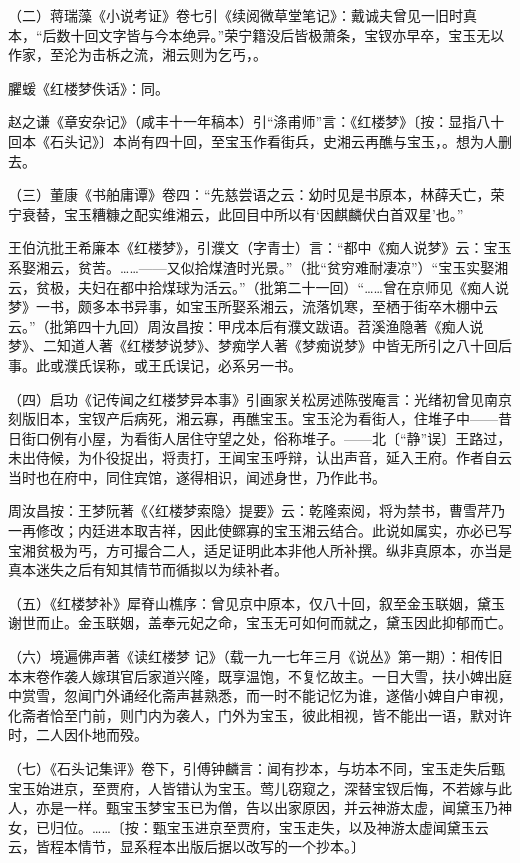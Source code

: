 \par （二）蒋瑞藻《小说考证》卷七引《续阅微草堂笔记》：戴诚夫曾见一旧时真本，“后数十回文字皆与今本绝异。”荣宁籍没后皆极萧条，宝钗亦早卒，宝玉无以作家，至沦为击柝之流，湘云则为乞丐，。
\par 臞蝯《红楼梦佚话》：同。
\par 赵之谦《章安杂记》（咸丰十一年稿本）引“涤甫师”言：《红楼梦》〔按：显指八十回本《石头记》〕本尚有四十回，至宝玉作看街兵，史湘云再醮与宝玉，。想为人删去。
\par （三）董康《书舶庸谭》卷四：“先慈尝语之云：幼时见是书原本，林薛夭亡，荣宁衰替，宝玉糟糠之配实维湘云，此回目中所以有‘因麒麟伏白首双星’也。”
\par 王伯沆批王希廉本《红楼梦》，引濮文\ZhiXian （字青士）言：“都中《痴人说梦》云：宝玉系娶湘云，贫苦。……——又似拾煤渣时光景。”（批“贫穷难耐凄凉”）“宝玉实娶湘云，贫极，夫妇在都中拾煤球为活云。”（批第二十一回）“……曾在京师见《痴人说梦》一书，颇多本书异事，如宝玉所娶系湘云，流落饥寒，至栖于街卒木棚中云云。”（批第四十九回）周汝昌按：甲戌本后有濮文\ZhiXian 跋语。苕溪渔隐著《痴人说梦》、二知道人著《红楼梦说梦》、梦痴学人著《梦痴说梦》中皆无所引之八十回后事。此或濮氏误称，或王氏误记，必系另一书。
\par （四）启功《记传闻之红楼梦异本事》引画家关松房述陈弢庵言：光绪初曾见南京刻版旧本，宝钗产后病死，湘云寡，再醮宝玉。宝玉沦为看街人，住堆子中——昔日街口例有小屋，为看街人居住守望之处，俗称堆子。——北〔“静”误〕王路过，未出侍候，为仆役捉出，将责打，王闻宝玉呼辩，认出声音，延入王府。作者自云当时也在府中，同住宾馆，遂得相识，闻述身世，乃作此书。
\par 周汝昌按：王梦阮著《〈红楼梦索隐〉提要》云：乾隆索阅，将为禁书，曹雪芹乃一再修改；内廷进本取吉祥，因此使鳏寡的宝玉湘云结合。此说如属实，亦必已写宝湘贫极为丐，方可撮合二人，适足证明此本非他人所补撰。纵非真原本，亦当是真本迷失之后有知其情节而循拟以为续补者。
\par （五）《红楼梦补》犀脊山樵序：曾见京中原本，仅八十回，叙至金玉联姻，黛玉谢世而止。金玉联姻，盖奉元妃之命，宝玉无可如何而就之，黛玉因此抑郁而亡。
\par （六）境遍佛声著《读红楼梦 记》（载一九一七年三月《说丛》第一期）：相传旧本末卷作袭人嫁琪官后家道兴隆，既享温饱，不复忆故主。一日大雪，扶小婢出庭中赏雪，忽闻门外诵经化斋声甚熟悉，而一时不能记忆为谁，遂偕小婢自户审视，化斋者恰至门前，则门内为袭人，门外为宝玉，彼此相视，皆不能出一语，默对许时，二人因仆地而殁。
\par （七）《石头记集评》卷下，引傅钟麟言：闻有抄本，与坊本不同，宝玉走失后甄宝玉始进京，至贾府，人皆错认为宝玉。莺儿窃窥之，深替宝钗后悔，不若嫁与此人，亦是一样。甄宝玉梦宝玉已为僧，告以出家原因，并云神游太虚，闻黛玉乃神女，已归位。……〔按：甄宝玉进京至贾府，宝玉走失，以及神游太虚闻黛玉云云，皆程本情节，显系程本出版后据以改写的一个抄本。〕
